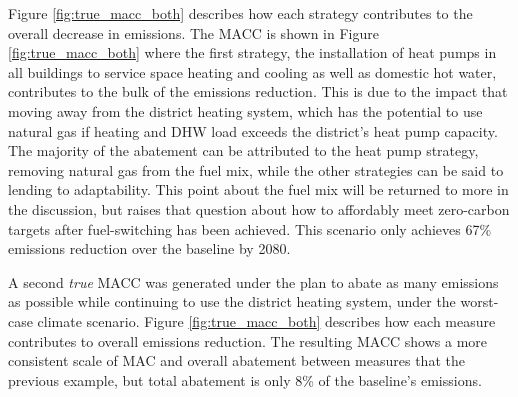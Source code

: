 \documentclass[twocolumn, a4paper,10pt]{article}
\begin{document}
Figure \ref{fig:true_macc_both} describes how each strategy contributes to the overall decrease in emissions. The MACC is shown in Figure \ref{fig:true_macc_both} where the first strategy, the installation of heat pumps in all buildings to service space heating and cooling as well as domestic hot water, contributes to the bulk of the emissions reduction. This is due to the impact that moving away from the district heating system, which has the potential to use natural gas if heating and DHW load exceeds the district's heat pump capacity. The majority of the abatement can be attributed to the heat pump strategy, removing natural gas from the fuel mix, while the other strategies can be said to lending to adaptability. This point about the fuel mix will be returned to more in the discussion, but raises that question about how to affordably meet zero-carbon targets after fuel-switching has been achieved. This scenario only achieves 67\% emissions reduction over the baseline by 2080.


A second \textit{true} MACC was generated under the plan to abate as many emissions as possible while continuing to use the district heating system, under the worst-case climate scenario. Figure \ref{fig:true_macc_both} describes how each measure contributes to overall emissions reduction. The resulting MACC shows a more consistent scale of MAC and overall abatement between measures that the previous example, but total abatement is only 8\% of the baseline's emissions.



\end{document}
